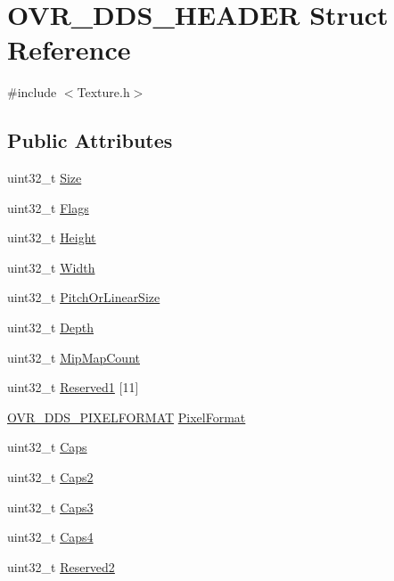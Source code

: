 \hypertarget{struct_o_v_r___d_d_s___h_e_a_d_e_r}{}\section{O\+V\+R\+\_\+\+D\+D\+S\+\_\+\+H\+E\+A\+D\+ER Struct Reference}
\label{struct_o_v_r___d_d_s___h_e_a_d_e_r}


{\ttfamily \#include $<$Texture.\+h$>$}

\subsection*{Public Attributes}
\begin{DoxyCompactItemize}
\item 
uint32\+\_\+t \hyperlink{struct_o_v_r___d_d_s___h_e_a_d_e_r_a8c1fe9cdf1df7ef768513ea787cc69df}{Size}
\item 
uint32\+\_\+t \hyperlink{struct_o_v_r___d_d_s___h_e_a_d_e_r_a7701760de4aeb07f33e5a1141c50c334}{Flags}
\item 
uint32\+\_\+t \hyperlink{struct_o_v_r___d_d_s___h_e_a_d_e_r_aaf372cb66c243fab87315de1c4ae3715}{Height}
\item 
uint32\+\_\+t \hyperlink{struct_o_v_r___d_d_s___h_e_a_d_e_r_af4fdcef5698afebef9d5ad1270955e83}{Width}
\item 
uint32\+\_\+t \hyperlink{struct_o_v_r___d_d_s___h_e_a_d_e_r_afdf22b486a6d83b40c75485ba7dd5201}{Pitch\+Or\+Linear\+Size}
\item 
uint32\+\_\+t \hyperlink{struct_o_v_r___d_d_s___h_e_a_d_e_r_a38d00463f692dc2cb59dcec2a4fe98ab}{Depth}
\item 
uint32\+\_\+t \hyperlink{struct_o_v_r___d_d_s___h_e_a_d_e_r_a30cbe5ea75efe0dcfa9dba5b85a33181}{Mip\+Map\+Count}
\item 
uint32\+\_\+t \hyperlink{struct_o_v_r___d_d_s___h_e_a_d_e_r_a12513401bbedd0015684e76e655ce68f}{Reserved1} \mbox{[}11\mbox{]}
\item 
\hyperlink{struct_o_v_r___d_d_s___p_i_x_e_l_f_o_r_m_a_t}{O\+V\+R\+\_\+\+D\+D\+S\+\_\+\+P\+I\+X\+E\+L\+F\+O\+R\+M\+AT} \hyperlink{struct_o_v_r___d_d_s___h_e_a_d_e_r_a6dbb449fbd15f9ae6059c01c52b850f8}{Pixel\+Format}
\item 
uint32\+\_\+t \hyperlink{struct_o_v_r___d_d_s___h_e_a_d_e_r_ae26689533e4dc96fb01fbac9b134ee82}{Caps}
\item 
uint32\+\_\+t \hyperlink{struct_o_v_r___d_d_s___h_e_a_d_e_r_a46003795661aca494a01c8dfdaaabff2}{Caps2}
\item 
uint32\+\_\+t \hyperlink{struct_o_v_r___d_d_s___h_e_a_d_e_r_a7c9728203fa2e68704cbe6e26cda63bf}{Caps3}
\item 
uint32\+\_\+t \hyperlink{struct_o_v_r___d_d_s___h_e_a_d_e_r_acb1e99be9c651193f22200620496a643}{Caps4}
\item 
uint32\+\_\+t \hyperlink{struct_o_v_r___d_d_s___h_e_a_d_e_r_a84a855e10c383f3b54704891beaece9d}{Reserved2}
\end{DoxyCompactItemize}


